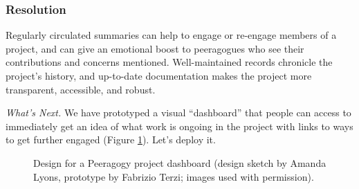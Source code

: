 \subsubsection*{Resolution} 
Regularly circulated summaries can help to engage or re-engage members of a project, and can give an emotional boost to peeragogues who see their contributions and concerns mentioned.  Well-maintained records chronicle the project's history, and up-to-date documentation makes the project more transparent, accessible, and robust.

\begin{framed}
\emph{What's Next.}
We have prototyped a visual ``dashboard'' that people can access to immediately get an idea of what work is ongoing in the project with links to ways to get further engaged (Figure \ref{dashboard}).  Let's deploy it.
\end{framed}    


\begin{figure}
\caption{Design for a Peeragogy project dashboard (design sketch by Amanda Lyons, prototype by Fabrizio Terzi; images used with permission).\label{dashboard}}
\end{figure}

